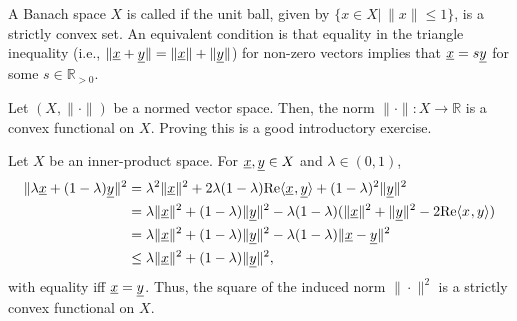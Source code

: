 \begin{definition}
A Banach space $X$ is called  if the unit ball,  given by $\{ x\in X | \, \| x \| \leq 1 \}$, is a strictly convex set.
An equivalent condition is that equality in the triangle inequality (i.e., $\| \underline{x} + \underline{y} \| = \| \underline{x} \| + \| \underline{y} \|$) for non-zero vectors implies that $ \underline{x} = s \underline{y} $ for some $s\in \mathbb{R}_{>0}$.
\end{definition}


\begin{example}
Let $(X,\|\cdot\|)$ be a normed vector space.
Then, the norm $\| \cdot \| \colon X \rightarrow \mathbb{R}$ is a convex functional on $X$.
Proving this is a good introductory exercise.
\end{example}

\begin{example}
Let $X$ be an inner-product space. For $\underline{x},\underline{y} \in X$ and $\lambda \in (0,1)$,
\begin{align*}
\|\lambda \underline x + (1-\lambda) \underline y \|^2
&= \lambda^2 \| \underline x\|^2 + 2\lambda(1-\lambda) \mathrm{Re} {\langle  \underline x  \mskip1mu ,   \underline y  \rangle} + (1-\lambda)^2 \|\underline y\|^2 \\
&= \lambda \| \underline x\|^2 + (1-\lambda)\|\underline y\|^2 - \lambda (1-\lambda) (\|\underline x\|^2+\|\underline y\|^2-2 \mathrm{Re} {\langle  x  \mskip1mu ,  y  \rangle})\\
&= \lambda \| \underline x\|^2 + (1-\lambda)\|\underline y\|^2 - \lambda (1-\lambda) \|\underline x - \underline y\|^2 \\
&\leq \lambda \| \underline x\|^2 + (1-\lambda)\|\underline y\|^2,
\end{align*}
with equality iff $\underline{x}=\underline{y}$.
Thus, the square of the induced norm $\| \cdot \|^2$ is a strictly convex functional on $X$.
\end{example}

